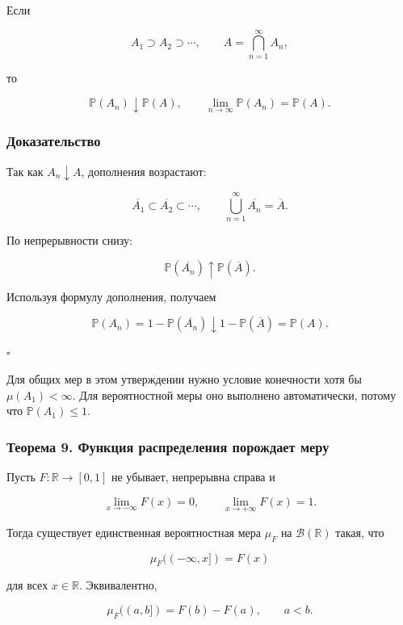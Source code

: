 \documentclass[
  11pt,
  a4paper,
]{article}
\begin{document}
Если

\[
A_1\supset A_2\supset\cdots,
\qquad
A=\bigcap_{n=1}^{\infty}A_n,
\]

то

\[
\mathbb P(A_n)\downarrow\mathbb P(A),
\qquad
\lim_{n\to\infty}\mathbb P(A_n)=\mathbb P(A).
\]

\subsubsection{Доказательство}\label{ux434ux43eux43aux430ux437ux430ux442ux435ux43bux44cux441ux442ux432ux43e-7}

Так как \(A_n\downarrow A\), дополнения возрастают:

\[
\overline{A_1}\subset \overline{A_2}\subset\cdots,
\qquad
\bigcup_{n=1}^{\infty}\overline{A_n}=\overline{A}.
\]

По непрерывности снизу:

\[
\mathbb P(\overline{A_n})\uparrow\mathbb P(\overline{A}).
\]

Используя формулу дополнения, получаем

\[
\mathbb P(A_n)=1-\mathbb P(\overline{A_n})
\downarrow
1-\mathbb P(\overline{A})
=
\mathbb P(A).
\]

\(\square\)

Для общих мер в этом утверждении нужно условие конечности хотя бы
\(\mu(A_1)<\infty\). Для вероятностной меры оно выполнено автоматически,
потому что \(\mathbb P(A_1)\le1\).

\subsubsection{Теорема 9. Функция распределения порождает
меру}\label{ux442ux435ux43eux440ux435ux43cux430-9.-ux444ux443ux43dux43aux446ux438ux44f-ux440ux430ux441ux43fux440ux435ux434ux435ux43bux435ux43dux438ux44f-ux43fux43eux440ux43eux436ux434ux430ux435ux442-ux43cux435ux440ux443}

Пусть \(F:\mathbb R\to[0,1]\) не убывает, непрерывна справа и

\[
\lim_{x\to-\infty}F(x)=0,\qquad
\lim_{x\to+\infty}F(x)=1.
\]

Тогда существует единственная вероятностная мера \(\mu_F\) на
\(\mathcal B(\mathbb R)\) такая, что

\[
\mu_F((-\infty,x])=F(x)
\]

для всех \(x\in\mathbb R\). Эквивалентно,

\[
\mu_F((a,b])=F(b)-F(a),\qquad a<b.
\]
\end{document}
